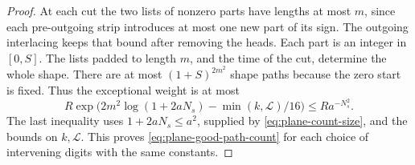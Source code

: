 \begin{proof}
At each cut the two lists of nonzero parts have lengths at
most \(m\), since each pre-outgoing strip introduces at most
one new part of its sign. The outgoing interlacing keeps that
bound after removing the heads. Each part is an integer in
\([0,S]\). The lists padded to length \(m\), and the time of
the cut, determine the whole shape. There are at most
\((1+S)^{2m^2}\) shape paths because the zero start is fixed.
Thus the exceptional weight is at most
\[
 R\exp\bigl(2m^2\log(1+2aN_s)-\min(k,\mathcal L)/16\bigr)
 \le R a^{-N_s^2}.
\]
The last inequality uses \(1+2aN_s\le a^2\), supplied by
\eqref{eq:plane-count-size}, and the bounds on \(k,\mathcal L\).
This proves \eqref{eq:plane-good-path-count} for each choice
of intervening digits with the same constants.
\end{proof}
